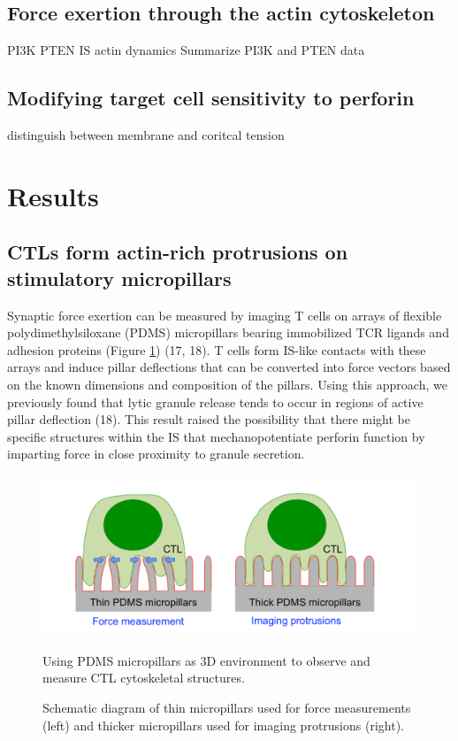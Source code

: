\subsection{Force exertion through the actin cytoskeleton}
PI3K PTEN IS actin dynamics
Summarize PI3K and PTEN data

\subsection{Modifying target cell sensitivity to perforin}
distinguish between membrane and coritcal tension

\section{Results} 

\subsection{CTLs form actin-rich protrusions on stimulatory micropillars}
Synaptic force exertion can be measured by imaging T cells on arrays of flexible polydimethylsiloxane (PDMS) micropillars bearing immobilized TCR ligands and adhesion proteins (Figure \ref{fig:fig1pillarscartoon}) (17, 18). T cells form IS-like contacts with these arrays and induce pillar deflections that can be converted into force vectors based on the known dimensions and composition of the pillars. Using this approach, we previously found that lytic granule release tends to occur in regions of active pillar deflection (18). This result raised the possibility that there might be specific structures within the IS that mechanopotentiate perforin function by imparting force in close proximity to granule secretion.

\begin{figure}[htbp]
	\centering
	\includegraphics[width=\textwidth]{../figures/chapter2/fig1pillarscartoon.png}
	\caption{Using PDMS micropillars as 3D environment to observe and measure CTL cytoskeletal structures.}
	\caption*{Schematic diagram of thin micropillars used for force measurements (left) and thicker micropillars used for imaging protrusions (right).}
	\label{fig:fig1pillarscartoon}
\end{figure}

